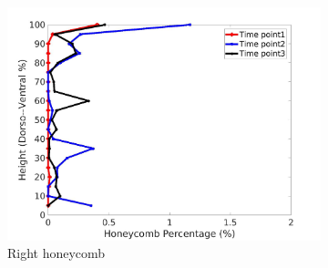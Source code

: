 \begin{figure}[H]
\begin{subfigure}{.42\linewidth}
  \includegraphics[width=\linewidth,trim={{.0\wd0} {.0\wd0} {.0\wd0} {.0\wd0}},clip]{QuantitativeAnalysis/Image/IPF21RightLungHoneycombDiseaseDorsoToVentral.jpg}
  \caption{Right honeycomb}
  \label{fig:IPF21DiseaseDorsoToVentralMain-f}
\end{subfigure}
\begin{subfigure}{.42\linewidth}%

\end{subfigure}
\end{figure}
